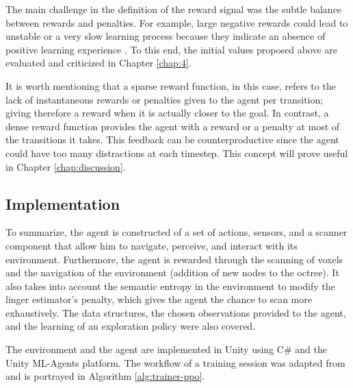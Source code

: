 The main challenge in the definition of the reward signal was the subtle balance between rewards and penalties. For example, large negative rewards could lead to unstable or a very slow learning process because they indicate an absence of positive learning experience \cite{sutton2018reinforcement}. To this end, the initial values proposed above are evaluated and criticized in Chapter \ref{chap:4}.

 It is worth mentioning that a sparse reward function, in this case, refers to the lack of instantaneous rewards or penalties given to the agent per transition; giving therefore a reward when it is actually closer to the goal. In contrast, a dense reward function provides the agent with a reward or a penalty at most of the transitions it takes. This feedback can be counterproductive since the agent could have too many distractions at each timestep. This concept will prove useful in Chapter \ref{chap:discussion}.



\subsection{Implementation}
To summarize, the agent is constructed of a set of actions, sensors, and a scanner component that allow him to navigate, perceive, and interact with its environment. Furthermore, the agent is rewarded through the scanning of voxels and the navigation of the environment (addition of new nodes to the octree). It also takes into account the semantic entropy in the environment to modify the linger estimator's penalty, which gives the agent the chance to scan more exhaustively. The data structures, the chosen observations provided to the agent, and the learning of an exploration policy were also covered. 

The environment and the agent are implemented in Unity using C# and the Unity ML-Agents platform. 
The workflow of a training session was adapted from \cite{eriksson2021deep} and is portrayed in Algorithm \ref{alg:trainer-ppo}.

